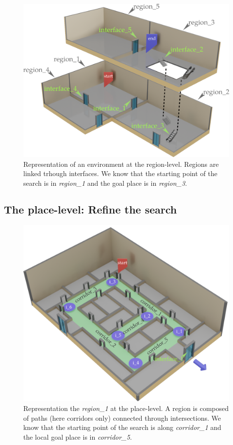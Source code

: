 \begin{figure}[ht!]
\centering
\includegraphics[scale=0.22]{figures/chapter3/building_regions.png}
\caption{\label{fig:chap3_regions} Representation of an environment at the region-level. Regions are linked trhough interfaces. We know that the starting point of the search is in \textit{region\_1} and the goal place is in \textit{region\_3}. }
\end{figure}


\subsection{The place-level: Refine the search}

\begin{figure}[ht!]
\centering
\includegraphics[scale=0.28]{figures/chapter3/region1.png}
\caption{\label{fig:chap3_region1} Representation the \textit{region\_1} at the place-level. A region is composed of paths (here corridors only) connected through intersections. We know that the starting point of the search is along \textit{corridor\_1} and the local goal place is in \textit{corridor\_5}. }
\end{figure}

